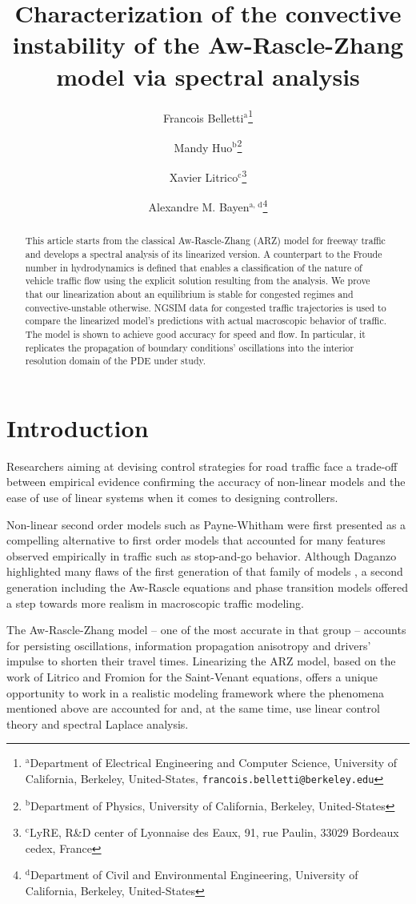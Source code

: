 \documentclass[letterpaper, 10 pt, conference]{ieeeconf}  %
\title{\LARGE \bf
Characterization of the convective instability of the Aw-Rascle-Zhang model via spectral analysis
}
\author{ \centering Francois Belletti$^{\text{a}}$\thanks{$^{\text{a}}$Department of Electrical Engineering and Computer Science, University of California, Berkeley, United-States, {\tt\small francois.belletti@berkeley.edu}}
		 \and
		 Mandy Huo$^{\text{b}}$\thanks{$^{\text{b}}$Department of Physics, University of California, Berkeley, United-States}
		 \and
		 Xavier Litrico$^{\text{c}}$\thanks{$^{\text{c}}$LyRE, R\&D center of Lyonnaise des Eaux, 91, rue Paulin, 33029 Bordeaux cedex, France}
		\and
		 Alexandre M. Bayen$^{\text{a, d}}$\thanks{$^{\text{d}}$Department of Civil and Environmental Engineering, University of California, Berkeley, United-States}
}
\begin{document}
\maketitle
\thispagestyle{empty}
\pagestyle{empty}

\begin{abstract}
This article starts from the classical Aw-Rascle-Zhang (ARZ) model for freeway traffic and develops a spectral analysis of its linearized version. A counterpart to the Froude number in hydrodynamics is defined that enables a classification of the nature of vehicle traffic flow using the explicit solution resulting from the analysis. We prove that our linearization about an equilibrium is stable for congested regimes and convective-unstable otherwise. NGSIM data for congested traffic trajectories is used to compare the linearized model's predictions with actual macroscopic behavior of traffic. The model is shown to achieve good accuracy for speed and flow. In particular, it replicates the propagation of boundary conditions' oscillations into the interior resolution domain of the PDE under study.
\end{abstract}


\section{Introduction}

Researchers aiming at devising control strategies for road traffic face a trade-off between empirical evidence confirming the accuracy of non-linear models \cite{zielke2008empirical, Jamitons2008} and the ease of use of linear systems when it comes to designing controllers.

Non-linear second order models such as Payne-Whitham \cite{payne1971models, whitham1974linear} were first presented as a compelling alternative to first order models \cite{LW, Richards} that accounted for many features observed empirically in traffic such as stop-and-go behavior. Although Daganzo highlighted many flaws of the first generation of that family of models \cite{Dag_requiem}, a second generation including the Aw-Rascle equations \cite{AR} and phase transition models \cite{colombo2003hyperbolic} offered a step towards more realism in macroscopic traffic modeling.

The Aw-Rascle-Zhang model -- one of the most accurate in that group \cite{Fan} -- accounts for persisting oscillations, information propagation anisotropy and drivers' impulse to shorten their travel times. Linearizing the ARZ model, based on the work of Litrico and Fromion \cite{litrico2009modeling} for the Saint-Venant equations, offers a unique opportunity to work in a realistic modeling framework where the phenomena mentioned above are accounted for and, at the same time, use linear control theory and spectral Laplace analysis.
\end{document}
